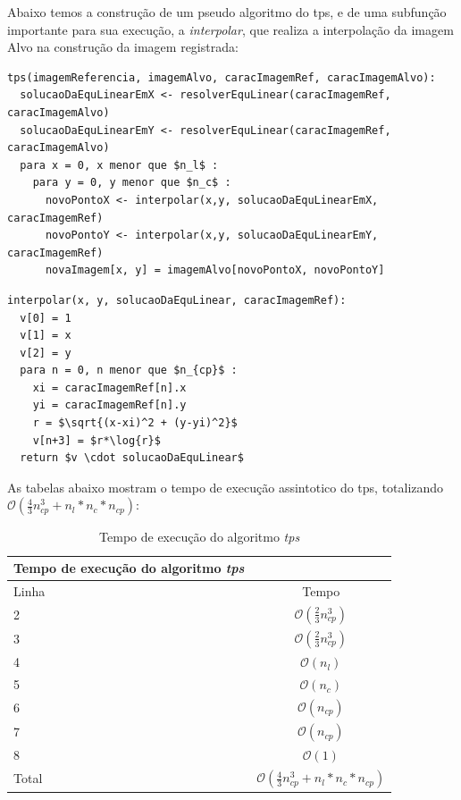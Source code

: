   Abaixo temos a construção de um pseudo algoritmo do tps, e de uma subfunção importante para sua execução, a 
\textit{interpolar}, que realiza a interpolação da imagem Alvo na construção da imagem registrada:

\begin{lstlisting}[mathescape]
tps(imagemReferencia, imagemAlvo, caracImagemRef, caracImagemAlvo):
  solucaoDaEquLinearEmX <- resolverEquLinear(caracImagemRef, caracImagemAlvo)
  solucaoDaEquLinearEmY <- resolverEquLinear(caracImagemRef, caracImagemAlvo)
  para x = 0, x menor que $n_l$ :
    para y = 0, y menor que $n_c$ :
      novoPontoX <- interpolar(x,y, solucaoDaEquLinearEmX, caracImagemRef)
      novoPontoY <- interpolar(x,y, solucaoDaEquLinearEmY, caracImagemRef)
      novaImagem[x, y] = imagemAlvo[novoPontoX, novoPontoY]
\end{lstlisting}

\begin{lstlisting}[mathescape]
interpolar(x, y, solucaoDaEquLinear, caracImagemRef):
  v[0] = 1
  v[1] = x
  v[2] = y
  para n = 0, n menor que $n_{cp}$ :
    xi = caracImagemRef[n].x
    yi = caracImagemRef[n].y
    r = $\sqrt{(x-xi)^2 + (y-yi)^2}$
    v[n+3] = $r*\log{r}$
  return $v \cdot solucaoDaEquLinear$ 
\end{lstlisting}

  As tabelas abaixo mostram o tempo de execução assintotico do tps, totalizando 
$\mathcal{O}(\frac{4}{3}n_{cp}^3+n_l*n_c*n_{cp})$:

\begin{table}[H]
\begin{center}
\begin{tabular}{l|c}
\hline
Tempo de execução do algoritmo \textit{tps} \\
\hline
Linha&Tempo\\
\hline
2       &$\mathcal{O}(\frac{2}{3}n_{cp}^3)$\\
3       &$\mathcal{O}(\frac{2}{3}n_{cp}^3)$\\
4       &$\mathcal{O}(n_l)$\\
5       &$\mathcal{O}(n_c)$\\
6       &$\mathcal{O}(n_{cp})$\\
7       &$\mathcal{O}(n_{cp})$\\
8       &$\mathcal{O}(1)$\\
\hline
Total   &$\mathcal{O}(\frac{4}{3}n_{cp}^3+n_l*n_c*n_{cp})$\\
\hline
\end{tabular}
\caption{Tempo de execução do algoritmo \textit{tps}}
\label{table:tps}
\end{center}
\end{table}

